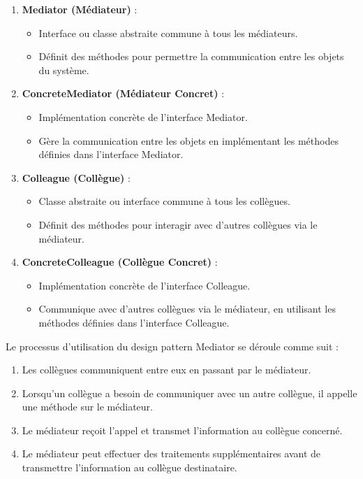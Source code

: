 \documentclass[french]{article}
\begin{document}
\begin{enumerate}
    \item \textbf{Mediator (Médiateur)} :
    \begin{itemize}
        \item Interface ou classe abstraite commune à tous les médiateurs.
        \item Définit des méthodes pour permettre la communication entre les objets du système.
    \end{itemize}
    
    \item \textbf{ConcreteMediator (Médiateur Concret)} :
    \begin{itemize}
        \item Implémentation concrète de l'interface Mediator.
        \item Gère la communication entre les objets en implémentant les méthodes définies dans l'interface Mediator.
    \end{itemize}
    
    \item \textbf{Colleague (Collègue)} :
    \begin{itemize}
        \item Classe abstraite ou interface commune à tous les collègues.
        \item Définit des méthodes pour interagir avec d'autres collègues via le médiateur.
    \end{itemize}
    
    \item \textbf{ConcreteColleague (Collègue Concret)} :
    \begin{itemize}
        \item Implémentation concrète de l'interface Colleague.
        \item Communique avec d'autres collègues via le médiateur, en utilisant les méthodes définies dans l'interface Colleague.
    \end{itemize}
\end{enumerate}

Le processus d'utilisation du design pattern Mediator se déroule comme suit :

\begin{enumerate}
    \item Les collègues communiquent entre eux en passant par le médiateur.
    \item Lorsqu'un collègue a besoin de communiquer avec un autre collègue, il appelle une méthode sur le médiateur.
    \item Le médiateur reçoit l'appel et transmet l'information au collègue concerné.
    \item Le médiateur peut effectuer des traitements supplémentaires avant de transmettre l'information au collègue destinataire.
\end{enumerate}
\end{document}
